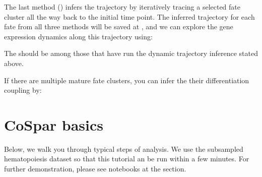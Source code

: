 \documentclass[letterpaper,10pt,english]{sphinxmanual}
\begin{document}
\begin{sphinxVerbatim}[commandchars=\\\{\}]
\end{sphinxVerbatim}

The last method () infers the trajectory by iteratively tracing a selected fate cluster all the way back to the initial time point. The inferred trajectory for each fate from all three methods will be saved at , and we can explore the gene expression dynamics along this trajectory using:

\begin{sphinxVerbatim}[commandchars=\\\{\}]
\end{sphinxVerbatim}

The  should be among those that have run the dynamic trajectory inference stated above.

If there are multiple mature fate clusters, you can infer the their differentiation coupling by:

\begin{sphinxVerbatim}[commandchars=\\\{\}]
\end{sphinxVerbatim}


\section{CoSpar basics}
\label{\detokenize{20210121_cospar_tutorial:CoSpar-basics}}\label{\detokenize{20210121_cospar_tutorial::doc}}
Below, we walk you through typical steps of analysis. We use the subsampled hematopoiesis dataset so that this tutorial an be run within a few minutes. For further demonstration, please see notebooks at the  section.
\end{document}
